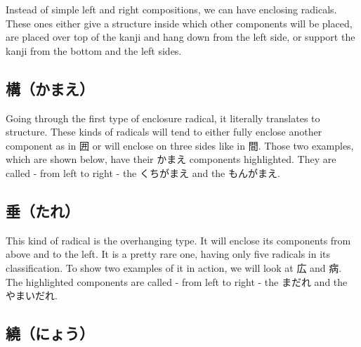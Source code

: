 Instead of simple left and right compositions, we can have enclosing radicals. These ones either give a structure inside which other components will be placed, are placed over top of the kanji and hang down from the left side, or support the kanji from the bottom and the left sides.

\subsection*{構（かまえ）}\label{ssec:PR;漢字;部首;かまえ}

Going through the first type of enclosure radical, it literally translates to structure. These kinds of radicals will tend to either fully enclose another component as in 囲 or will enclose on three sides like in 間. Those two examples, which are shown below, have their かまえ components highlighted. They are called - from left to right - the くちがまえ and the もんがまえ.

\begin{figure}[H]\label{fig:PR;漢字;部首;かまえ}
	\centering
	
	\hspace{0.5in}
	
\end{figure}

\subsection*{垂（たれ）}\label{ssec:PR;漢字;部首;たれ}

This kind of radical is the overhanging type. It will enclose its components from above and to the left. It is a pretty rare one, having only five radicals in its classification. To show two examples of it in action, we will look at 広 and 病. The highlighted components are called - from left to right - the まだれ and the やまいだれ.

\begin{figure}[H]\label{fig:PR;漢字;部首;たれ}
	\centering
	
	\hspace{0.5in}
	
\end{figure}

\subsection*{繞（にょう）}\label{ssec:PR;漢字;部首;にょう}

